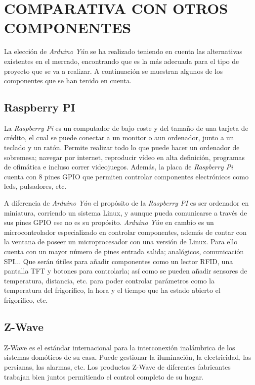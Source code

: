 \section{COMPARATIVA CON OTROS COMPONENTES}

La elección de \emph{Arduino Yún} se ha realizado teniendo en cuenta las alternativas existentes en el mercado, encontrando que es la más adecuada para el tipo de proyecto que se va a realizar. A continuación se muestran algunos de los componentes que se han tenido en cuenta.

\subsection{Raspberry PI}


La \emph{Raspberry Pi} es un computador de bajo coste y del tamaño de una tarjeta de crédito, el cual se puede conectar a un monitor o aun ordenador, junto a un teclado y un ratón. Permite realizar todo lo que puede hacer un ordenador de sobremesa; navegar por internet, reproducir vídeo en alta definición, programas de ofimática e incluso correr videojuegos. Además, la placa de \emph{Raspberry Pi} cuenta con 8 pines GPIO que permiten controlar componentes electrónicos como leds, pulsadores, etc.

A diferencia de \emph{Arduino Yún} el propósito de la \emph{Raspberry PI} es ser ordenador en miniatura, corriendo un sistema Linux, y aunque pueda comunicarse a través de sus pines GPIO ese no es su propósito. \emph{Arduino Yún} en cambio es un microcontrolador especializado en controlar componentes, además de contar con la ventana de poseer un microprocesador con una versión de Linux. Para ello cuenta con un mayor número de pines entrada salida; analógicos, comunicación SPI... Que serán útiles para añadir componentes como un lector RFID, una pantalla TFT y botones para controlarla; así como se pueden añadir sensores de temperatura, distancia, etc. para poder controlar parámetros como la temperatura del frigorífico, la hora y el tiempo que ha estado abierto el frigorífico, etc.

\subsection{Z-Wave}

Z-Wave es el estándar internacional para la interconexión inalámbrica de los sistemas domóticos de su casa. Puede gestionar  la iluminación, la electricidad, las persianas, las alarmas, etc. Los productos Z-Wave de diferentes fabricantes trabajan bien juntos permitiendo el control completo de su hogar.

